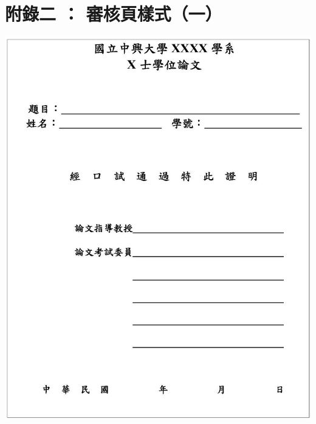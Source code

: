 \chapter{附錄二 ： 審核頁樣式（一）}
    \begin{center}
        \includegraphics[bb=0 0 1225 1527,width=\textwidth]{examine1.jpg}
    \end{center}

